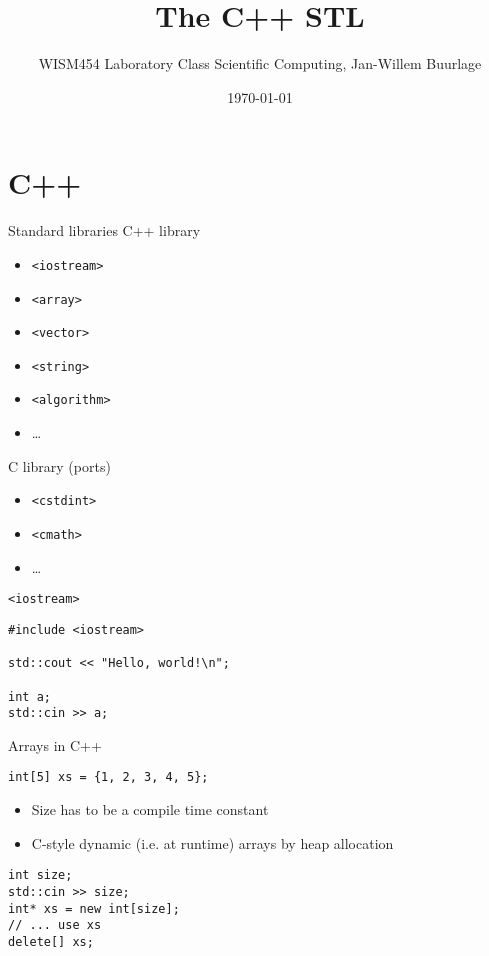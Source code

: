 \documentclass[10pt]{beamer}
\author{WISM454 Laboratory Class Scientific Computing, Jan-Willem Buurlage}
\date{\today}
\title{The C++ STL}
\begin{document}
\maketitle

\section{C++}
\label{sec:org49ca7af}
\begin{frame}[fragile,label={sec:org138134b}]{Standard libraries}
 C++ library

\begin{itemize}
\item \texttt{<iostream>}
\item \texttt{<array>}
\item \texttt{<vector>}
\item \texttt{<string>}
\item \texttt{<algorithm>}
\item \ldots{}
\end{itemize}

C library (ports)

\begin{itemize}
\item \texttt{<cstdint>}
\item \texttt{<cmath>}
\item \ldots{}
\end{itemize}
\end{frame}

\begin{frame}[fragile,label={sec:org0018880}]{\texttt{<iostream>}}
 \begin{verbatim}
#include <iostream>

std::cout << "Hello, world!\n";

int a;
std::cin >> a;
\end{verbatim}
\end{frame}

\begin{frame}[fragile,label={sec:org393c383}]{Arrays in C++}
 \begin{verbatim}
int[5] xs = {1, 2, 3, 4, 5};
\end{verbatim}
\begin{itemize}
\item Size has to be a compile time constant
\item C-style dynamic (i.e. at runtime) arrays by heap allocation
\end{itemize}

\begin{verbatim}
int size;
std::cin >> size;
int* xs = new int[size];
// ... use xs
delete[] xs;
\end{verbatim}
\end{frame}
\end{document}
